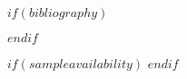 \documentclass[$journal$,$type$,$status$,moreauthors,pdftex,10pt,a4paper]{mdpi}
\begin{document}

$if(bibliography)$

$endif$

$if(sampleavailability)$
$endif$

\end{document}
